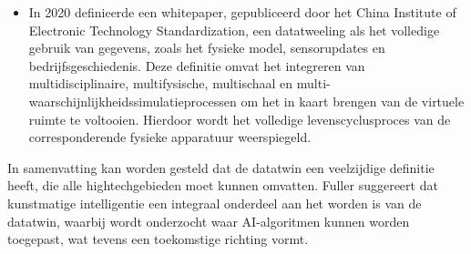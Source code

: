 \begin{itemize}
    \item In 2020 definieerde een whitepaper, gepubliceerd door het China Institute of Electronic Technology Standardization, een datatweeling als het volledige gebruik van gegevens, zoals het fysieke model, sensorupdates en bedrijfsgeschiedenis. Deze definitie omvat het integreren van multidisciplinaire, multifysische, multischaal en multi-waarschijnlijkheidssimulatieprocessen om het in kaart brengen van de virtuele ruimte te voltooien. Hierdoor wordt het volledige levenscyclusproces van de corresponderende fysieke apparatuur weerspiegeld.
\end{itemize}
In samenvatting kan worden gesteld dat de datatwin een veelzijdige definitie heeft, die alle hightechgebieden moet kunnen omvatten. Fuller suggereert dat kunstmatige intelligentie een integraal onderdeel aan het worden is van de datatwin, waarbij wordt onderzocht waar AI-algoritmen kunnen worden toegepast, wat tevens een toekomstige richting vormt.
\section{}
\label{sec:huidige-methoden}
\section{}
\label{sec:nfc-productauthenticatie}
\section{}
\label{sec:serverless-back-end-architectuur}
\section{}
\label{sec:smart-contracts-productauthenticatie}
\section{}
\label{sec:integratie}
